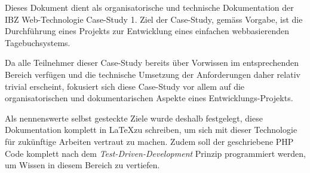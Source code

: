 \noindent
Dieses Dokument dient als organisatorische und technische Dokumentation der IBZ Web-Technologie Case-Study 1. Ziel der Case-Study, gemäss Vorgabe, ist die Durchführung eines Projekts zur Entwicklung eines einfachen webbasierenden Tagebuchsystems.

Da alle Teilnehmer dieser Case-Study bereits über Vorwissen im entsprechenden Bereich verfügen und die technische Umsetzung der Anforderungen daher relativ trivial erscheint, fokusiert sich diese Case-Study vor allem auf die organisatorischen und dokumentarischen Aspekte eines Entwicklungs-Projekts.

Als nennenswerte selbst gesteckte Ziele wurde deshalb festgelegt, diese Dokumentation komplett in \LaTeX zu schreiben, um sich mit dieser Technologie für zukünftige Arbeiten vertraut zu machen. Zudem soll der geschriebene PHP Code komplett nach dem \emph{Test-Driven-Development} Prinzip programmiert werden, um Wissen in diesem Bereich zu vertiefen.

